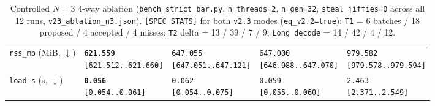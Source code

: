\documentclass[11pt,a4paper]{article}
\begin{document}
\begin{table}[h]
\begin{tabular}{@{}lllll@{}}
\texttt{rss\_mb} (MiB, $\downarrow$) & \shortstack[l]{\textbf{\texttt{621.559}}\\\scriptsize\texttt{[621.512..621.660]}} & \shortstack[l]{\texttt{647.055}\\\scriptsize\texttt{[647.051..647.121]}} & \shortstack[l]{\texttt{647.000}\\\scriptsize\texttt{[646.988..647.070]}} & \shortstack[l]{\texttt{979.582}\\\scriptsize\texttt{[979.578..979.594]}} \\
\texttt{load\_s} (s, $\downarrow$) & \shortstack[l]{\textbf{\texttt{0.056}}\\\scriptsize\texttt{[0.054..0.061]}} & \shortstack[l]{\texttt{0.062}\\\scriptsize\texttt{[0.054..0.075]}} & \shortstack[l]{\texttt{0.059}\\\scriptsize\texttt{[0.055..0.060]}} & \shortstack[l]{\texttt{2.463}\\\scriptsize\texttt{[2.371..2.549]}} \\
\bottomrule
\end{tabular}
\caption{Controlled $N=3$ 4-way ablation (\texttt{bench\_strict\_bar.py}, \texttt{n\_threads=2}, \texttt{n\_gen=32}, \texttt{steal\_jiffies=0} across all 12 runs, \texttt{v23\_ablation\_n3.json}). \texttt{[SPEC STATS]} for both \texttt{v2.3} modes (\texttt{eq\_v2.2=true}): \texttt{T1} = 6 batches / 18 proposed / 4 accepted / 4 misses; \texttt{T2} delta = 13 / 39 / 7 / 9; \texttt{Long decode} = 14 / 42 / 4 / 12.}
\label{tab:v23_ablation}
\end{table}
\end{document}
